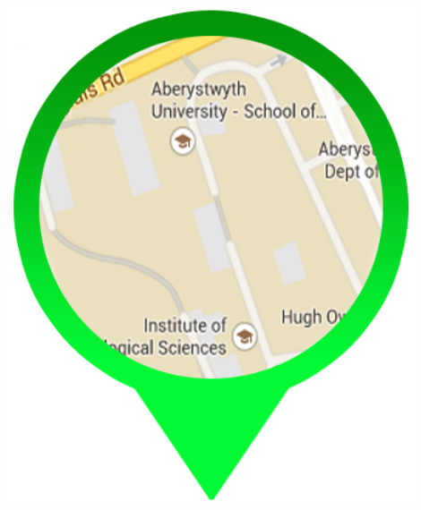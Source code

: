 \documentclass[a0,landscape]{a0poster}
\begin{document}
\begin{minipage}[b]{0.19\linewidth}
\includegraphics[width=12cm]{logo.png} %
\end{minipage}

\vspace{1cm} %

\end{document}
